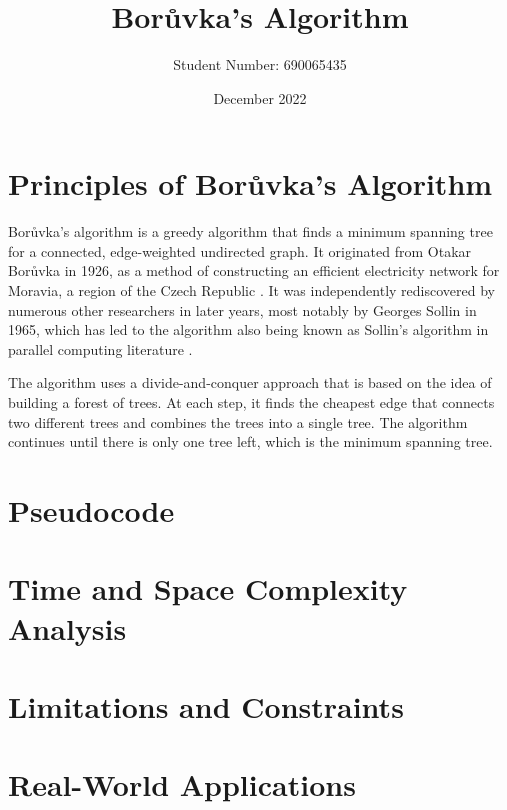 \documentclass[a4paper, 11pt]{article}
\begin{document}
\title{Borůvka's Algorithm}
\author{Student Number: 690065435}
\date{December 2022}
\maketitle

\section{Principles of Borůvka's Algorithm}
Borůvka's algorithm is a greedy algorithm that finds a minimum spanning tree for a connected, edge-weighted undirected graph. It originated from Otakar Borůvka in 1926, as a method of constructing an efficient electricity network for Moravia, a region of the Czech Republic \cite{nevsetvril2001otakar}. It was independently rediscovered by numerous other researchers in later years, most notably by Georges Sollin in 1965, which has led to the algorithm also being known as Sollin's algorithm in parallel computing literature \cite{sollin1965trace}.

The algorithm uses a divide-and-conquer approach that is based on the idea of building a forest of trees. At each step, it finds the cheapest edge that connects two different trees and combines the trees into a single tree. The algorithm continues until there is only one tree left, which is the minimum spanning tree.

\section{Pseudocode}

\section{Time and Space Complexity Analysis}

\section{Limitations and Constraints}

\section{Real-World Applications}



\end{document}
